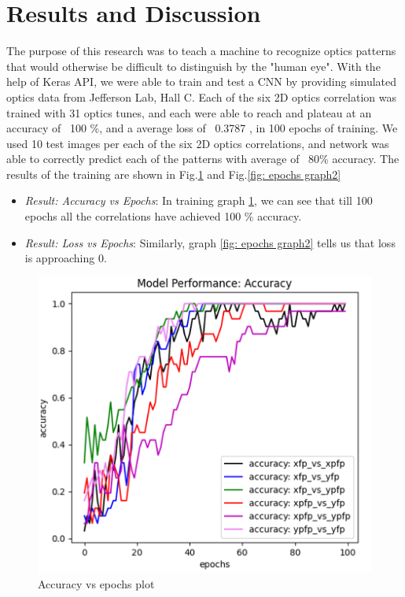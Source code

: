 \documentclass[conference]{IEEEtran}
\begin{document}
\section{Results and Discussion}
\indent The purpose of this research was to teach a machine to recognize optics patterns that would otherwise be
difficult to distinguish by the "human eye". With the help of Keras API, we were able to train and test a CNN
by providing simulated optics data from Jefferson Lab, Hall C.  Each of the six 2D optics correlation was trained with
31 optics tunes, and each were able to reach and plateau at an accuracy of ~100 \%, and a average loss of ~0.3787 , in 100 epochs of training.
We used 10 test images per each of the six 2D optics correlations, and network was able to correctly predict each of the patterns with average of ~80\% accuracy. The results of the training are shown in Fig.\ref{fig: epochs graph1} and Fig.\ref{fig: epochs graph2}

\begin{itemize}
\item \emph{Result: Accuracy vs Epochs}: In training graph \ref{fig: epochs graph1}, we can see that till 100 epochs all the correlations have achieved 100 \% accuracy.
\item \emph{Result: Loss vs Epochs}: Similarly, graph \ref{fig: epochs graph2} tells us that loss is approaching $0$.
\end{itemize} 

\begin{figure}[h]
  \centering
  \includegraphics[scale=0.29]{images/acc_plot.png}
  \caption{Accuracy vs epochs plot}
  \label{fig: epochs graph1}
\end{figure}
\end{document}
